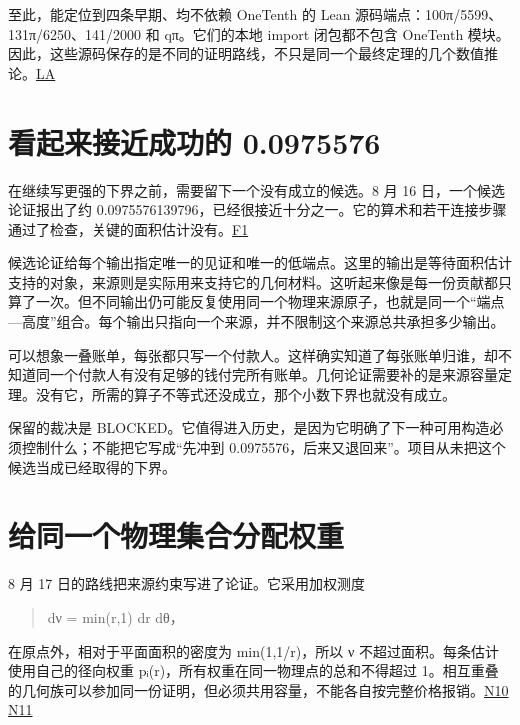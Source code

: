至此，能定位到四条早期、均不依赖 OneTenth 的 Lean 源码端点：100π/5599、131π/6250、141/2000 和 qπ。它们的本地 import 闭包都不包含 OneTenth 模块。因此，这些源码保存的是不同的证明路线，不只是同一个最终定理的几个数值推论。\href{https://github.com/subfish-zhou/star-shaped-kakeya-lean/blob/6432d8eb33cc2093ed5ca1f5e63390e4bf065fd0/audits/historical-lean-audit.md}{LA}

\section{\texorpdfstring{看起来接近成功的 \allowbreak{}0.0975576}{看起来接近成功的 0.0975576}}\label{ux770bux8d77ux6765ux63a5ux8fd1ux6210ux529fux7684-0.0975576}

在继续写更强的下界之前，需要留下一个没有成立的候选。8 月 16 日，一个候选论证报出了约 \allowbreak{}0.0975576139796，已经很接近十分之一。它的算术和若干连接步骤通过了检查，关键的面积估计没有。\href{https://github.com/subfish-zhou/star-shaped-kakeya-lean/blob/6432d8eb33cc2093ed5ca1f5e63390e4bf065fd0/history/blocked-09755/STATUS_BLOCKED.md}{F1}

候选论证给每个输出指定唯一的见证和唯一的低端点。这里的输出是等待面积估计支持的对象，来源则是实际用来支持它的几何材料。这听起来像是每一份贡献都只算了一次。但不同输出仍可能反复使用同一个物理来源原子，也就是同一个``端点---高度''组合。每个输出只指向一个来源，并不限制这个来源总共承担多少输出。

可以想象一叠账单，每张都只写一个付款人。这样确实知道了每张账单归谁，却不知道同一个付款人有没有足够的钱付完所有账单。几何论证需要补的是来源容量定理。没有它，所需的算子不等式还没成立，那个小数下界也就没有成立。

保留的裁决是 BLOCKED。它值得进入历史，是因为它明确了下一种可用构造必须控制什么；不能把它写成``先冲到 \allowbreak{}0.0975576，后来又退回来''。项目从未把这个候选当成已经取得的下界。

\section{给同一个物理集合分配权重}\label{ux7ed9ux540cux4e00ux4e2aux7269ux7406ux96c6ux5408ux5206ux914dux6743ux91cd}

8 月 17 日的路线把来源约束写进了论证。它采用加权测度

\begin{quote}
dν = min(r,1) dr dθ，
\end{quote}

在原点外，相对于平面面积的密度为 min(1,1/r)，所以 ν 不超过面积。每条估计使用自己的径向权重 pᵢ(r)，所有权重在同一物理点的总和不得超过 1。相互重叠的几何族可以参加同一份证明，但必须共用容量，不能各自按完整价格报销。\href{https://github.com/subfish-zhou/star-shaped-kakeya-lean/blob/6432d8eb33cc2093ed5ca1f5e63390e4bf065fd0/history/final-radial-price-theorem/CERTIFIED.md}{N10} \href{https://github.com/subfish-zhou/star-shaped-kakeya-lean/blob/6432d8eb33cc2093ed5ca1f5e63390e4bf065fd0/history/final-radial-price-theorem/final_theorem_checklist_20260817_zh.md}{N11}

